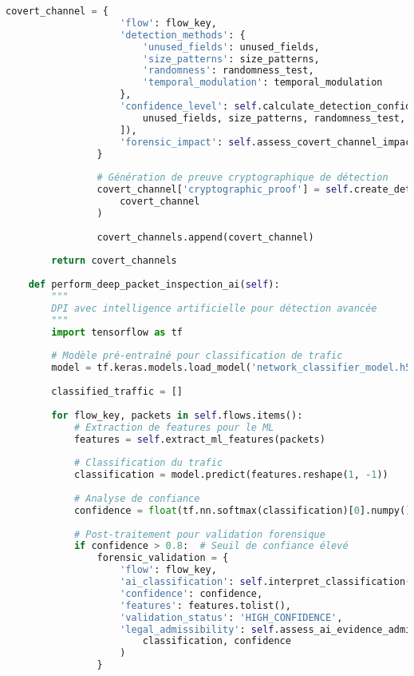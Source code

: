 \begin{lstlisting}[language=Python, caption=Système de capture PCAP avec validation d'intégrité]
                covert_channel = {
                    'flow': flow_key,
                    'detection_methods': {
                        'unused_fields': unused_fields,
                        'size_patterns': size_patterns,
                        'randomness': randomness_test,
                        'temporal_modulation': temporal_modulation
                    },
                    'confidence_level': self.calculate_detection_confidence([
                        unused_fields, size_patterns, randomness_test, temporal_modulation
                    ]),
                    'forensic_impact': self.assess_covert_channel_impact(flow_key)
                }
                
                # Génération de preuve cryptographique de détection
                covert_channel['cryptographic_proof'] = self.create_detection_proof(
                    covert_channel
                )
                
                covert_channels.append(covert_channel)
                
        return covert_channels
    
    def perform_deep_packet_inspection_ai(self):
        """
        DPI avec intelligence artificielle pour détection avancée
        """
        import tensorflow as tf
        
        # Modèle pré-entraîné pour classification de trafic
        model = tf.keras.models.load_model('network_classifier_model.h5')
        
        classified_traffic = []
        
        for flow_key, packets in self.flows.items():
            # Extraction de features pour le ML
            features = self.extract_ml_features(packets)
            
            # Classification du trafic
            classification = model.predict(features.reshape(1, -1))
            
            # Analyse de confiance
            confidence = float(tf.nn.softmax(classification)[0].numpy().max())
            
            # Post-traitement pour validation forensique
            if confidence > 0.8:  # Seuil de confiance élevé
                forensic_validation = {
                    'flow': flow_key,
                    'ai_classification': self.interpret_classification(classification),
                    'confidence': confidence,
                    'features': features.tolist(),
                    'validation_status': 'HIGH_CONFIDENCE',
                    'legal_admissibility': self.assess_ai_evidence_admissibility(
                        classification, confidence
                    )
                }
                

\end{lstlisting}
